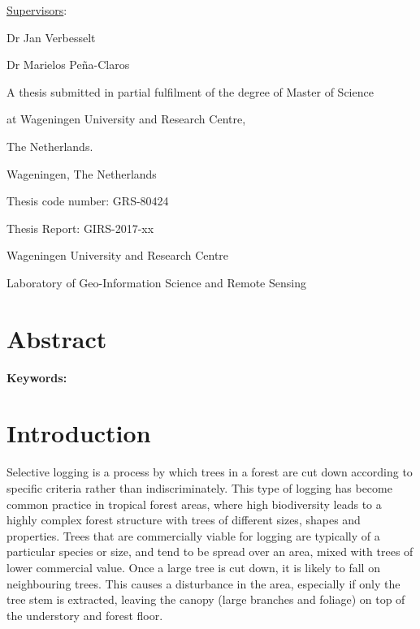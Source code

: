 \documentclass[a4paper,12pt]{scrbook}
\begin{document}
\begin{titlingpage}
\begin{center}
  {\large \underline{Supervisors}:}\vspace{1.1cm}
  
  {Dr Jan Verbesselt}
  
  {Dr Marielos Peña-Claros}\vspace{3.0cm}
  
  {A thesis submitted in partial fulfilment of the degree of Master of Science}
  
  {at Wageningen University and Research Centre,}
  
  {The Netherlands.}\vspace{2.7cm}
  \end{center}
  
  \begin{flushright}
    {\thedate}
  
    {Wageningen, The Netherlands}
  \end{flushright}\vspace{0.5cm}

    Thesis code number: GRS-80424
  
    Thesis Report: GIRS-2017-xx
  
    {Wageningen University and Research Centre}
  
    {Laboratory of Geo-Information Science and Remote Sensing}
 \end{titlingpage}

\chapter*{Abstract}

\textbf{Keywords:} 

\tableofcontents

\chapter{Introduction}

Selective logging is a process by which trees in a forest are cut down according to specific criteria rather than indiscriminately. This type of logging has become common practice in tropical forest areas, where high biodiversity leads to a highly complex forest structure with trees of different sizes, shapes and properties. Trees that are commercially viable for logging are typically of a particular species or size, and tend to be spread over an area, mixed with trees of lower commercial value. Once a large tree is cut down, it is likely to fall on neighbouring trees. This causes a disturbance in the area, especially if only the tree stem is extracted, leaving the canopy (large branches and foliage) on top of the understory and forest floor.
\end{document}
